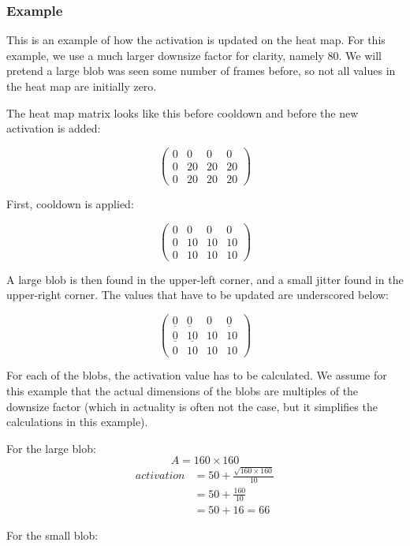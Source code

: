 \documentclass[a4paper,10pt]{article}
\begin{document}
\subsubsection{Example}\label{sec:heatmapexample}
This is an example of how the activation is updated on the heat map.
For this example, we use a much larger downsize factor for clarity,
namely $80$. We will pretend a large blob was seen some number of frames
before, so not all values in the heat map are initially zero.

The heat map matrix looks like this before cooldown and before 
the new activation is added:

\[\left(\begin{array}{cccc}
0 & 0 & 0 & 0 \\
0 & 20 & 20 & 20 \\
0 & 20 & 20 & 20 \end{array}\right)\]

First, cooldown is applied:

\[\left(\begin{array}{cccc}
0 & 0 & 0 & 0 \\
0 & 10 & 10 & 10 \\
0 & 10 & 10 & 10 \end{array}\right)\]

A large blob is then found in the upper-left corner, and a small jitter
found in the upper-right corner. The values that have to be updated are
underscored below:

\[\left(\begin{array}{cccc}
\underline{0} & \underline{0} & 0 & \underline{0} \\
\underline{0} & \underline{10} & 10 & 10 \\
0 & 10 & 10 & 10 \end{array}\right)\]

For each of the blobs, the activation value has to be calculated.
We assume for this example that the actual dimensions of the blobs are
multiples of the downsize factor (which in actuality is often not the
case, but it simplifies the calculations in this example).

For the large blob:
\[
	A=160\times160
\]
\begin{align*}
 activation &=50 + \frac{\sqrt{160\times160}}{10} \\
  &=50 + \frac{160}{10} \\
	 &= 50 + 16 = 66
\end{align*}

For the small blob:
\end{document}
